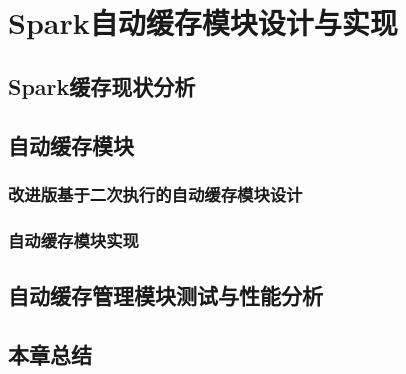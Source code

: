 \chapter{Spark自动缓存模块设计与实现}\label{chap:guide}

\section{Spark缓存现状分析}
\section{自动缓存模块}
\subsection{改进版基于二次执行的自动缓存模块设计}
\subsection{自动缓存模块实现}
\section{自动缓存管理模块测试与性能分析}
\section{本章总结}


